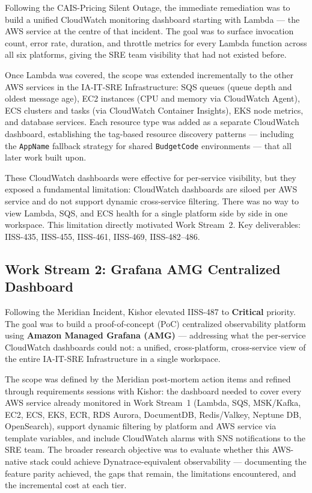 Following the CAIS-Pricing Silent Outage, the immediate
remediation was to build a unified CloudWatch monitoring dashboard starting
with Lambda --- the AWS service at the centre of that incident. The goal was
to surface invocation count, error rate, duration, and throttle metrics
for every Lambda function across all six platforms, giving the SRE team
visibility that had not existed before.

Once Lambda was covered, the scope was extended incrementally to the other
AWS services in the IA-IT-SRE Infrastructure: SQS queues (queue depth and
oldest message age), EC2 instances (CPU and memory via CloudWatch Agent),
ECS clusters and tasks (via CloudWatch Container Insights), EKS node metrics,
and database services. Each resource type was added as a separate CloudWatch
dashboard, establishing the tag-based resource discovery patterns ---
including the \texttt{AppName} fallback strategy for shared \texttt{BudgetCode}
environments --- that all later work built upon.

These CloudWatch dashboards were effective for per-service visibility, but
they exposed a fundamental limitation: CloudWatch dashboards are siloed
per AWS service and do not support dynamic cross-service filtering. There was
no way to view Lambda, SQS, and ECS health for a single platform side by side
in one workspace. This limitation directly motivated Work Stream~2.
Key deliverables: IISS-435, IISS-455, IISS-461, IISS-469, IISS-482--486.

\subsection{Work Stream 2: Grafana AMG Centralized Dashboard}

Following the Meridian Incident, Kishor elevated IISS-487 to
\textbf{Critical} priority. The goal was to build a proof-of-concept (PoC)
centralized observability platform using \textbf{Amazon Managed Grafana
(AMG)} --- addressing what the per-service CloudWatch dashboards could not:
a unified, cross-platform, cross-service view of the entire IA-IT-SRE
Infrastructure in a single workspace.

The scope was defined by the Meridian post-mortem action items and refined
through requirements sessions with Kishor: the dashboard needed to cover
every AWS service already monitored in Work Stream~1 (Lambda, SQS, MSK/Kafka,
EC2, ECS, EKS, ECR, RDS Aurora, DocumentDB, Redis/Valkey, Neptune DB, OpenSearch),
support dynamic filtering by platform and AWS service via template variables,
and include CloudWatch alarms with SNS notifications to the SRE team. The
broader research objective was to evaluate whether this AWS-native stack could
achieve Dynatrace-equivalent observability --- documenting the feature parity
achieved, the gaps that remain, the limitations encountered, and the
incremental cost at each tier.

